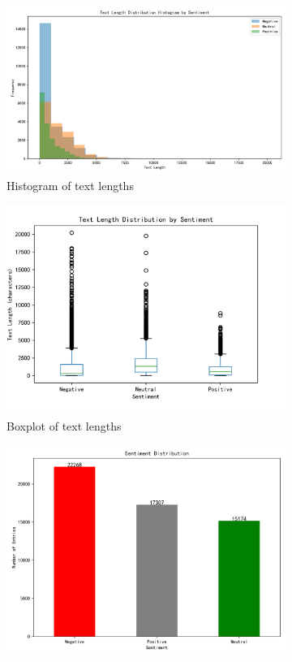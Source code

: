\documentclass[12pt]{article}
\begin{document}
\begin{figure}[!ht]
	\centering
	\begin{subfigure}[b]{0.32\textwidth}
	\includegraphics[width=\linewidth]{text_length_histogram.png}
	\caption{Histogram of text lengths}
	\end{subfigure}
	\hfill
	\begin{subfigure}[b]{0.32\textwidth}
	\includegraphics[width=\linewidth]{text_length_boxplot.png}
	\caption{Boxplot of text lengths}
	\end{subfigure}
	\hfill
	\begin{subfigure}[b]{0.32\textwidth}
	\includegraphics[width=\linewidth]{sentiment_distribution.png}

\end{subfigure}
\end{figure}
\end{document}
